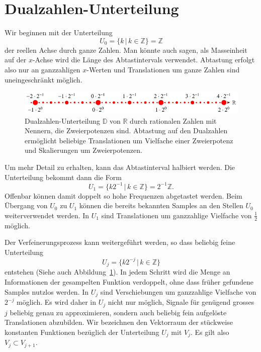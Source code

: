 %
%
%
\section{Dualzahlen-Unterteilung%
\label{section:dualzahlen}}
Wir beginnen mit der Unterteilung
\[
U_0
=
\{ k\,|\, k\in\mathbb Z\}
=
\mathbb Z
\]
der reellen Achse durch ganze Zahlen.
Man könnte auch sagen, als Masseinheit auf der $x$-Achse wird die
Länge des Abtastintervals verwendet.
Abtastung erfolgt also nur an ganzzahligen $x$-Werten und
Translationen um ganze Zahlen sind uneingeschränkt möglich.

\begin{figure}
\centering
\includegraphics{chapters/3-haar/images/dual.pdf}
\caption{Dualzahlen-Unterteilung $\mathbb D$ von $\mathbb R$ durch
rationalen Zahlen mit Nennern, die Zweierpotenzen sind. 
Abtastung auf den Dualzahlen ermöglicht beliebige Translationen um
Vielfache einer Zweierpotenz und Skalierungen um Zweierpotenzen.
\label{haar:figure:dualzahlen}}
\end{figure}
Um mehr Detail zu erhalten, kann das Abtastinterval halbiert werden.
Die Unterteilung bekommt dann die Form
\[
U_1
=
\{ k2^{-1}\,|\, k\in\mathbb Z\}
=
2^{-1}\mathbb Z.
\]
Offenbar können damit doppelt so hohe Frequenzen abgetastet werden.
Beim Übergang von $U_0$ zu $U_1$ können die bereits bekannten Samples
an den Stellen $U_0$ weiterverwendet werden.
In $U_1$ sind Translationen um ganzzahlige Vielfache von $\frac12$ 
möglich.

Der Verfeinerungsprozess kann weitergeführt werden, so dass beliebig
feine Unterteilung
\[
U_j = \{ k2^{-j}\,|\,k\in\mathbb Z\}
\]
entstehen (Siehe auch Abbildung~\ref{haar:figure:dualzahlen}).
In jedem Schritt wird die Menge an Informationen der gesampelten Funktion
verdoppelt, ohne dass früher gefundene Samples nutzlos werden.
In $U_j$ sind Verschiebungen um ganzzahlige Vielfache von $2^{-j}$ 
möglich.
Es wird daher in $U_j$ nicht nur möglich, Signale für genügend grosses $j$
beliebig genau zu approximieren, sondern auch beliebig fein aufgelöste
Translationen abzubilden.
Wir bezeichnen den Vektorraum der stückweise konstanten Funktionen
bezüglich der Unterteilung $U_j$ mit $V_j$.
Es gilt also $V_j \subset V_{j+1}$.

